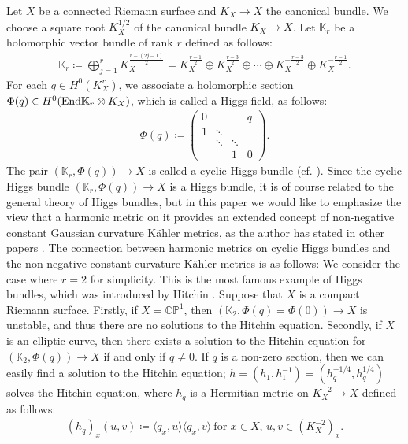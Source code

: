 \documentclass[12pt]{article}
\theoremstyle{definition}
\def\End{{\rm End}}
\def\K{{\mathbb K}}
\def\CP{{\mathbb C}{\mathbb P}}
\begin{document}
Let $X$ be a connected Riemann surface and $K_X\rightarrow X$ the canonical bundle. We choose a square root $K_X^{1/2}$ of the canonical bundle $K_X\rightarrow X$. Let $\K_r$ be a holomorphic vector bundle of rank $r$ defined as follows:
\begin{align*}
\K_r\coloneqq \bigoplus_{j=1}^r K_X^{\frac{r-(2j-1)}{2}} = K_X^{\frac{r-1}{2}} \oplus K_X^{\frac{r-3}{2}} \oplus \cdots \oplus K_X^{-\frac{r-3}{2}} \oplus K_X^{-\frac{r-1}{2}}.
\end{align*}
For each $q\in H^0(K_X^r)$, we associate a holomorphic section $\Phi(q)\in H^0(\End \K_r\otimes K_X)$, which is called a Higgs field, as follows:
\begin{align*}
\Phi(q)\coloneqq 
\left(
\begin{array}{cccc}
0 & && q \\ 
1 & \ddots && \\ 
& \ddots & \ddots & \\ 
& & 1 & 0
\end{array}
\right).
\end{align*}
The pair $(\K_r,\Phi(q))\rightarrow X$ is called a cyclic Higgs bundle (cf. \cite{Bar1}). Since the cyclic Higgs bundle $(\K_r,\Phi(q))\rightarrow X$ is a Higgs bundle, it is of course related to the general theory of Higgs bundles, but in this paper we would like to emphasize the view that a harmonic metric on it provides an extended concept of non-negative constant Gaussian curvature K\"ahler metrics, as the author has stated in other papers \cite{Miy4, Miy5}. The connection between harmonic metrics on cyclic Higgs bundles and the non-negative constant curvature K\"ahler metrics is as follows: We consider the case where $r=2$ for simplicity. This is the most famous example of Higgs bundles, which was introduced by Hitchin \cite[Section 11]{Hit1}. Suppose that $X$ is a compact Riemann surface. Firstly, if $X=\CP^1$, then $(\K_2,\Phi(q)=\Phi(0))\rightarrow X$ is unstable, and thus there are no solutions to the Hitchin equation. Secondly, if $X$ is an elliptic curve, then there exists a solution to the Hitchin equation for $(\K_2,\Phi(q))\rightarrow X$ if and only if $q\neq 0$. If $q$ is a non-zero section, then we can easily find a solution to the Hitchin equation; $h=(h_1, h_1^{-1})=(h_q^{-1/4}, h_q^{1/4})$ solves the Hitchin equation, where $h_q$ is a Hermitian metric on $K_X^{-2}\rightarrow X$ defined as follows:
\begin{align}
(h_q)_x(u,v)\coloneqq \langle q_x,u\rangle\overline{\langle q_x,v\rangle} \ \text{for $x\in X$, $u,v\in (K_X^{-2})_x$}. \label{uv}
\end{align}
\end{document}
